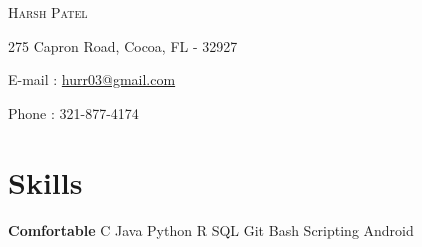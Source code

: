 \documentclass{my_resume_class}
\newcommand{\name}[1]{
   \centerline{\textsc{\huge{#1}}}
}
\newcommand{\contact}[1]{
   \centerline{\normalsize{#1}}
}
\begin{document}
\name{Harsh Patel}
\vspace{0.1cm}
\contact{275 Capron Road, Cocoa, FL - 32927}
\vspace{0.05cm}
\contact{E-mail : \href{mailto:hurr03@gmail.com}{hurr03@gmail.com}}
\vspace{0.05cm}
\contact{Phone : 321-877-4174 }


\section{Skills}
{\textbf{Comfortable}  \hspace{0.80cm} C\hspace{0.50cm} Java\hspace{0.50cm} Python \hspace{0.50cm} R \hspace{0.50cm} SQL\hspace{0.50cm}  Git\hspace{0.50cm} Bash Scripting\hspace{0.50cm} Android } \\
\end{document}
